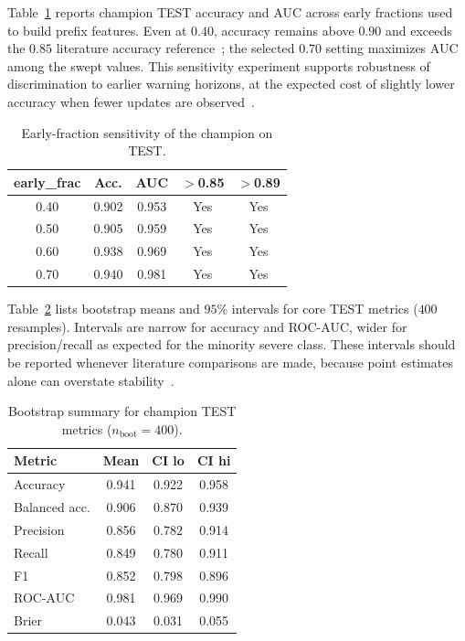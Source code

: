 Table~\ref{tab:early} reports champion TEST accuracy and AUC across early fractions used to build prefix features. Even at $0.40$, accuracy remains above $0.90$ and exceeds the $0.85$ literature accuracy reference~\cite{Khodabakhshian2025}; the selected $0.70$ setting maximizes AUC among the swept values. This sensitivity experiment supports robustness of discrimination to earlier warning horizons, at the expected cost of slightly lower accuracy when fewer updates are observed~\cite{Egwim2021,Tagharobi2025}.

\begin{table}[!ht]
\centering
\caption{Early-fraction sensitivity of the champion on TEST.}
\label{tab:early}
\begin{tabular}{|c|c|c|c|c|}
\hline
\textbf{early\_frac} & \textbf{Acc.} & \textbf{AUC} & \textbf{$>$0.85} & \textbf{$>$0.89} \\
\hline
0.40 & 0.902 & 0.953 & Yes & Yes \\
\hline
0.50 & 0.905 & 0.959 & Yes & Yes \\
\hline
0.60 & 0.938 & 0.969 & Yes & Yes \\
\hline
0.70 & 0.940 & 0.981 & Yes & Yes \\
\hline
\end{tabular}
\end{table}

Table~\ref{tab:boot} lists bootstrap means and $95\%$ intervals for core TEST metrics ($400$ resamples). Intervals are narrow for accuracy and ROC-AUC, wider for precision/recall as expected for the minority severe class. These intervals should be reported whenever literature comparisons are made, because point estimates alone can overstate stability~\cite{GneitingRaftery2007,Hand2009}.

\begin{table}[!ht]
\centering
\caption{Bootstrap summary for champion TEST metrics ($n_{\mathrm{boot}}{=}400$).}
\label{tab:boot}
\begin{tabular}{|l|c|c|c|}
\hline
\textbf{Metric} & \textbf{Mean} & \textbf{CI lo} & \textbf{CI hi} \\
\hline
Accuracy & 0.941 & 0.922 & 0.958 \\
\hline
Balanced acc. & 0.906 & 0.870 & 0.939 \\
\hline
Precision & 0.856 & 0.782 & 0.914 \\
\hline
Recall & 0.849 & 0.780 & 0.911 \\
\hline
F1 & 0.852 & 0.798 & 0.896 \\
\hline
ROC-AUC & 0.981 & 0.969 & 0.990 \\
\hline
Brier & 0.043 & 0.031 & 0.055 \\
\hline
\end{tabular}
\end{table}

